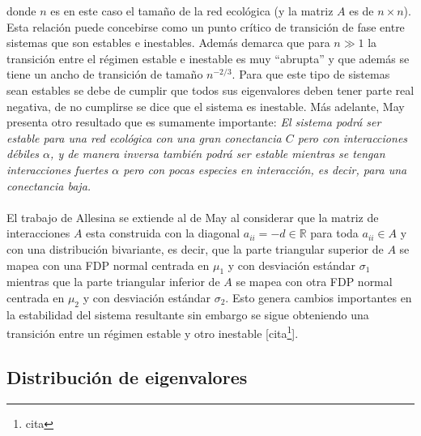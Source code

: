 donde $n$ es en este caso el tamaño de la red ecológica (y la matriz $A$ es de $n\times n$). Esta relación puede concebirse como un punto crítico de transición de fase entre sistemas que son estables e inestables. Además demarca que para $n\gg 1$ la transición entre el régimen estable e inestable es muy ``abrupta'' y que además se tiene un ancho de transición de tamaño $n^{-2/3}$. Para que este tipo de sistemas sean estables se debe de cumplir que todos sus eigenvalores deben tener parte real negativa, de no cumplirse se dice que el sistema es inestable. Más adelante, May presenta otro resultado que es sumamente importante: \textit{El sistema podrá ser estable para una red ecológica con una gran conectancia $C$ pero con interacciones débiles $\alpha$, y de manera inversa también podrá ser estable mientras se tengan interacciones fuertes $\alpha$ pero con pocas especies en interacción, es decir, para una conectancia baja.}\\
\\
El trabajo de Allesina se extiende al de May al considerar que la matriz de interacciones $A$ esta construida con la diagonal $a_{ii}=-d\in\mathbb{R}$ para toda $a_{ii}\in A$ y con una distribución bivariante, es decir, que la parte triangular superior de $A$ se mapea con una FDP normal centrada en $\mu_1$ y con desviación estándar $\sigma_1$ mientras que la parte triangular inferior de $A$ se mapea con otra FDP normal centrada en $\mu_2$ y con desviación estándar $\sigma_2$. Esto genera cambios importantes en la estabilidad del sistema resultante sin embargo se sigue obteniendo una transición entre un régimen estable y otro inestable [cita\footnote{cita}].

\subsection{Distribución de eigenvalores}


